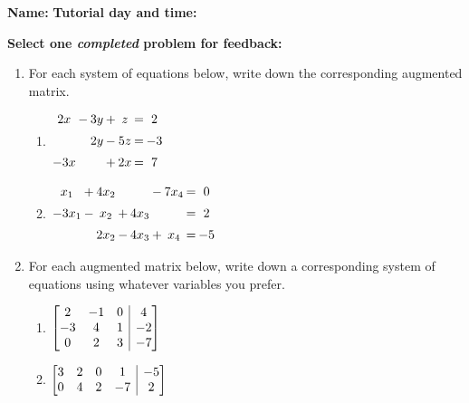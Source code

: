 \documentclass[12pt]{article}
\makeatletter
\newenvironment{amatrix}[1]{%
  \left[\begin{array}{@{}*{#1}{c}|c@{}}
}{%
  \end{array}\right]
}
\newcommand{\bam}{\begin{amatrix}}
\newcommand{\eam}{\end{amatrix}}
\makeatother
\begin{document}
{\bf \large Name:} \hspace{2.5in} {\bf Tutorial day and time:}

\bigskip

{\bf Select {\bf one} {\em completed} problem for feedback:}

\bigskip


\thispagestyle{fancy}
 \begin{enumerate}
\item For each system of equations below, write down the corresponding augmented matrix.
\begin{enumerate}
 \item $\arraycolsep=1pt\begin{array}{ccccccc}2x&-&3y&+&z&=&2\\[5pt] & &2y&-&5z&=&-3\\[5pt] -3x& & &+&2x&=&7\end{array}$

 \vspace{1cm}

 \item $\arraycolsep=1pt\begin{array}{ccccccccc}x_1&+&4x_2& & &-&7x_4&=&0\\[5pt]-3x_1&-&x_2&+&4x_3& & &=&2\\[5pt] & &2x_2&-&4x_3&+&x_4&=&-5\end{array}$

\end{enumerate}

\vspace{1cm}


\item For each augmented matrix below, write down a corresponding system of equations using whatever variables you prefer.
\begin{enumerate}
 \item $\bam{3}2&-1&0&4\\-3&4&1&-2\\0&2&3&-7\eam$

\vspace{1cm}

 \item $\bam{4}3&2&0&1&-5\\0&4&2&-7&2\eam$
\end{enumerate}

\vspace{1cm}


\end{enumerate}
\end{document}

